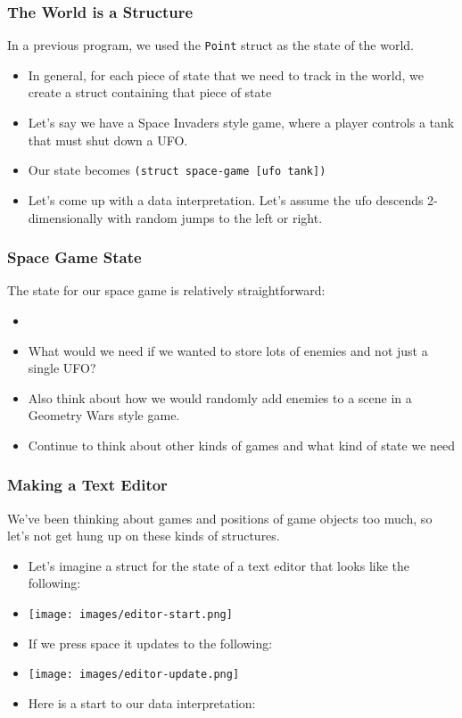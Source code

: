 \documentclass{beamer}
\begin{document}
\begin{frame}
  \frametitle{The World is a Structure}
  In a previous program, we used the \texttt{Point} struct as the
  state of the world.
  \begin{itemize}
  \item<2-> In general, for each piece of state that we need to
    track in the world, we create a struct containing that piece of state
  \item<3-> Let's say we have a Space Invaders style game, where a player
    controls a tank that must shut down a UFO.
  \item<4-> Our state becomes \texttt{(struct space-game [ufo tank])}
  \item<5-> Let's come up with a data interpretation. Let's assume the ufo
    descends 2-dimensionally with random jumps to the left or right.
  \end{itemize}
\end{frame}

\begin{frame}
  \frametitle{Space Game State}
  The state for our space game is relatively straightforward:
  \begin{itemize}
  \item<2-> \SpaceGameData
  \item<3-> What would we need if we wanted to store lots of enemies and not
    just a single UFO?
  \item<4-> Also think about how we would randomly add enemies to a scene in
    a Geometry Wars style game.
  \item<5-> Continue to think about other kinds of games and what kind of
    state we need
  \end{itemize}
\end{frame}


\begin{frame}
  \frametitle{Making a Text Editor}
  We've been thinking about games and positions of game objects
  too much, so let's not get hung up on these kinds of structures.
  \begin{itemize}
  \item<2-> Let's imagine a struct for the state of a text editor that looks
    like the following:
  \item<3-> \texttt{[image: images/editor-start.png]}
  \item<4-> If we press space it updates to the following:
  \item<5-> \texttt{[image: images/editor-update.png]}
  \item<6-> Here is a start to our data interpretation:
    \EditorState
  \end{itemize}
\end{frame}
\end{document}
